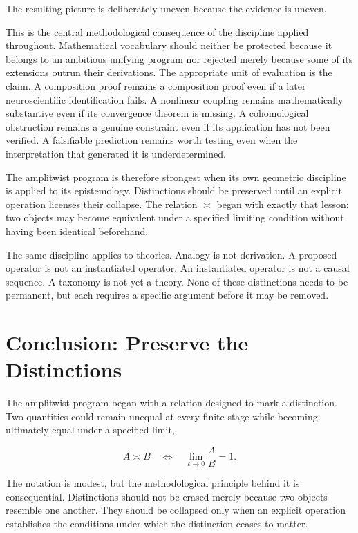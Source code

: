 \documentclass[11pt]{article}
\newcommand{\ulteq}{\mathrel{\text{≍}}}
\begin{document}
The resulting picture is deliberately uneven because the evidence is uneven.

This is the central methodological consequence of the discipline applied throughout. Mathematical vocabulary should neither be protected because it belongs to an ambitious unifying program nor rejected merely because some of its extensions outrun their derivations. The appropriate unit of evaluation is the claim. A composition proof remains a composition proof even if a later neuroscientific identification fails. A nonlinear coupling remains mathematically substantive even if its convergence theorem is missing. A cohomological obstruction remains a genuine constraint even if its application has not been verified. A falsifiable prediction remains worth testing even when the interpretation that generated it is underdetermined.

The amplitwist program is therefore strongest when its own geometric discipline is applied to its epistemology. Distinctions should be preserved until an explicit operation licenses their collapse. The relation $\ulteq$ began with exactly that lesson: two objects may become equivalent under a specified limiting condition without having been identical beforehand.

The same discipline applies to theories. Analogy is not derivation. A proposed operator is not an instantiated operator. An instantiated operator is not a causal sequence. A taxonomy is not yet a theory. None of these distinctions needs to be permanent, but each requires a specific argument before it may be removed.

\section{Conclusion: Preserve the Distinctions}

The amplitwist program began with a relation designed to mark a distinction. Two quantities could remain unequal at every finite stage while becoming ultimately equal under a specified limit,

\begin{equation}
A\ulteq B
\quad\Longleftrightarrow\quad
\lim_{\varepsilon\to0}\frac{A}{B}=1.
\end{equation}

The notation is modest, but the methodological principle behind it is consequential. Distinctions should not be erased merely because two objects resemble one another. They should be collapsed only when an explicit operation establishes the conditions under which the distinction ceases to matter.
\end{document}
